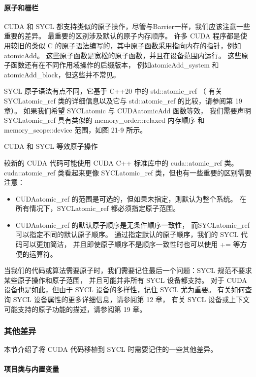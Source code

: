 \paragraph{原子和栅栏}

CUDA 和 SYCL 都支持类似的原子操作，尽管与Barrier一样，我们应该注意一些重要的差异。 
最重要的区别涉及默认的原子内存顺序。 
许多 CUDA 程序都是使用较旧的类似 C 的原子语法编写的，其中原子函数采用指向内存的指针，例如atomicAdd。 
这些原子函数是宽松的原子函数，并且在设备范围内运行。 
这些原子函数还有在不同作用域操作的后缀版本，
例如atomicAdd\_system 和atomicAdd\_block，但这些并不常见。

SYCL 原子语法有点不同，它基于 C++20 中的 std::atomic\_ref （
有关 SYCLatomic\_ref 类的详细信息以及它与 std::atomic\_ref 的比较，请参阅第 19 章）。 
如果我们希望 SYCLatomic 与 CUDAatomicAdd 函数等效，
我们需要声明 SYCLatomic\_ref 具有类似的 memory\_order::relaxed 内存顺序
和 memory\_scope::device 范围，如图 21-9 所示。

{\color{red} CUDA 和 SYCL 等效原子操作}

较新的 CUDA 代码可能使用 CUDA C++ 标准库中的 cuda::atomic\_ref 类。 
cuda::atomic\_ref 类看起来更像 SYCLatomic\_ref 类，但也有一些重要的区别需要注意：

\begin{itemize}
	\item CUDAatomic\_ref 的范围是可选的，但如果未指定，则默认为整个系统。 
在所有情况下，SYCLatomic\_ref 都必须指定原子范围。

	\item CUDAatomic\_ref 的默认原子顺序是无条件顺序一致性，
而SYCLatomic\_ref 可以指定不同的默认原子顺序。 
通过指定默认的原子顺序，我们的 SYCL 代码可以更加简洁，
并且即使原子顺序不是顺序一致性时也可以使用 += 等方便的运算符。
\end{itemize}

当我们的代码或算法需要原子时，我们需要记住最后一个问题：SYCL 规范不要求某些原子操作和原子范围，
并且可能并非所有 SYCL 设备都支持。 对于 CUDA 设备也是如此，但由于 SYCL 设备的多样性，记住 SYCL 尤为重要。 
有关如何查询 SYCL 设备属性的更多详细信息，请参阅第 12 章，
有关 SYCL 设备或上下文可能支持的原子功能的描述，请参阅第 19 章。

\subsubsection{其他差异}
本节介绍了将 CUDA 代码移植到 SYCL 时需要记住的一些其他差异。

\paragraph{项目类与内置变量}

